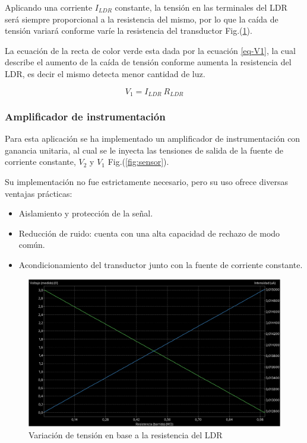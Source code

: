 \documentclass[12pt,a4paper,twoside,fleqn]{article}
\begin{document}
Aplicando una corriente $I_{LDR}$ constante, la tensión en las terminales del LDR será siempre proporcional a la resistencia del mismo, por lo que la caída de tensión variará conforme varíe la resistencia del transductor Fig.(\ref{fig:variacion-ldr}).

La ecuación de la recta de color verde esta dada por la ecuación \ref{eq-V1}, la cual describe el aumento de la caída de tensión conforme aumenta la resistencia del LDR, es decir el mismo detecta menor cantidad de luz.

\begin{equation}
    V_1 = I_{LDR}\ R_{LDR}
    \label{eq-V1}
\end{equation}

\subsubsection*{Amplificador de instrumentación}
Para esta aplicación se ha implementado un amplificador de instrumentación con ganancia unitaria, al cual se le inyecta las tensiones de salida de la fuente de corriente constante, $V_2$ y $V_1$ Fig.(\ref{fig:sensor}).\par
Su implementación no fue estrictamente necesario, pero su uso ofrece diversas ventajas prácticas:

\begin{itemize}
    \item Aislamiento y protección de la señal.
    \item Reducción de ruido: cuenta con una alta capacidad de rechazo de modo común.
    \item Acondicionamiento del transductor junto con la fuente de corriente constante.
\end{itemize}

\begin{figure}
    \centering
    \includegraphics[width=1\linewidth]{img/LDR.jpeg}
    \caption{Variación de tensión en base a la resistencia del LDR}
    \label{fig:variacion-ldr}
\end{figure}
\end{document}
